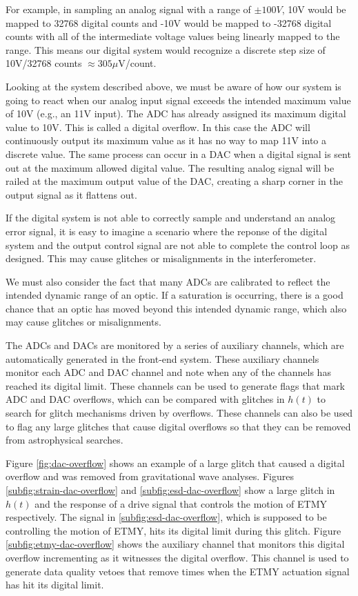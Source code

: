 For example, in sampling an analog signal with a range of $\pm100V$, 
10V would be mapped to 32768 digital counts and -10V would be mapped 
to -32768 digital counts with all 
of the intermediate voltage values being linearly mapped to the range. This 
means our digital system would recognize a discrete step size of 
10V/32768 counts $\approx 305 \mu $V/count.

Looking at the system described above, we must be aware of how our system 
is going to react when our analog input signal exceeds the intended maximum 
value of 10V (e.g., an 11V input). The ADC has already assigned its maximum 
digital value to 10V. This is called a digital overflow. In this case the ADC 
will continuously output its maximum value as it has no way to map 11V into 
a discrete value. The same process can occur in a DAC when a digital signal 
is sent out at the maximum allowed digital value. The resulting analog signal 
will be railed at the maximum output value of the DAC, creating a sharp corner 
in the output signal as it flattens out. 

If the digital system is not able to correctly sample and understand an analog 
error signal, it is easy to imagine a scenario where the reponse of the digital 
system and the output control signal are not able to complete the control loop 
as designed. This may cause glitches or misalignments in the interferometer.

We must also consider the fact that many ADCs are calibrated to reflect the 
intended dynamic range of an optic.  If a saturation is occurring, there is 
a good chance that an optic has moved beyond this intended dynamic range, which 
also may cause glitches or misalignments.

The ADCs and DACs are monitored by a series of auxiliary channels, which are 
automatically generated in the front-end system. These auxiliary channels 
monitor each ADC and DAC channel and note when any of the channels has reached 
its digital limit. These channels can be used to generate flags that mark 
ADC and DAC overflows, which can be compared with glitches in $h(t)$ to 
search for glitch mechanisms driven by overflows. These channels can also 
be used to flag any large glitches that cause digital overflows so that they 
can be removed from astrophysical searches. 

Figure \ref{fig:dac-overflow} shows an example of a large glitch that caused 
a digital overflow and was removed from gravitational wave analyses. Figures 
\ref{subfig:strain-dac-overflow} and \ref{subfig:esd-dac-overflow} show a 
large glitch in $h(t)$ and the response of a drive signal that controls 
the motion of ETMY respectively. The signal in \ref{subfig:esd-dac-overflow}, 
which is supposed to be controlling the motion of ETMY, hits its digital 
limit during this glitch. Figure \ref{subfig:etmy-dac-overflow} shows the 
auxiliary channel that monitors this digital overflow incrementing as 
it witnesses the digital overflow. This channel is used to generate 
data quality vetoes that remove times when the ETMY actuation signal has 
hit its digital limit.

